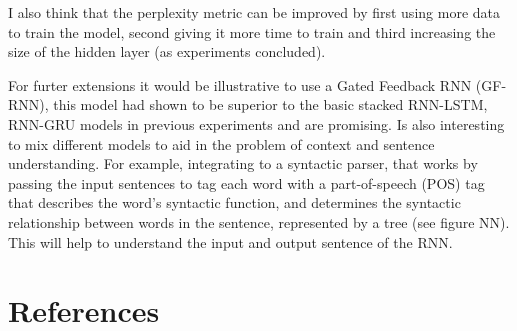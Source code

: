\documentclass{article} %
\begin{document}
I also think that the perplexity metric can be improved by first using more
data to train the model, second giving it more time to train and third
increasing the size of the hidden layer (as experiments concluded).

For furter extensions it would be illustrative to use a Gated Feedback RNN (GF-RNN),
this model had shown to be superior to the basic stacked RNN-LSTM, RNN-GRU
models in previous experiments and are promising. Is also interesting to mix
different models to aid in the problem of context and sentence understanding.
For example, integrating to a syntactic parser, that works by passing the input
sentences to tag each word with a part-of-speech (POS) tag that describes the
word's syntactic function, and determines the syntactic relationship between
words in the sentence, represented by a tree (see figure NN). This will help to
understand the input and output sentence of the RNN.


\section{References}
\end{document}
